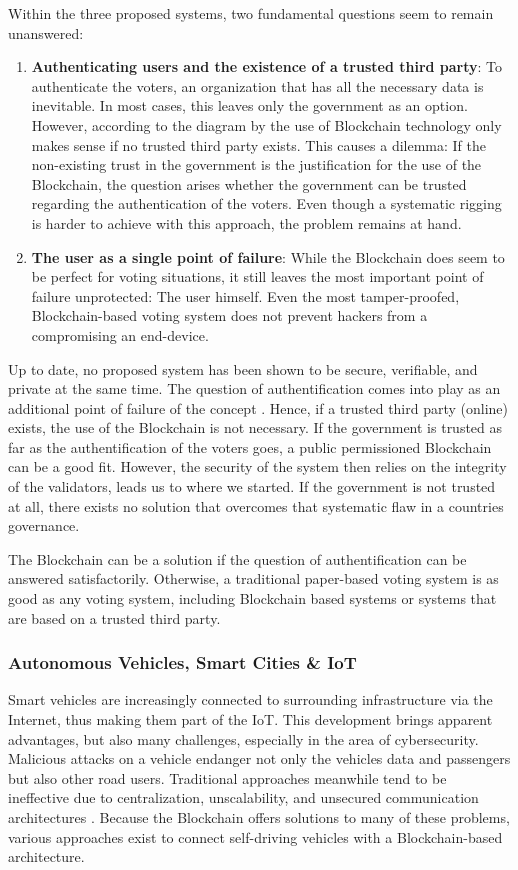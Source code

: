 Within the three proposed systems, two fundamental questions seem to remain unanswered:
\begin{enumerate}
    \item \textbf{Authenticating users and the existence of a trusted third party}: To authenticate the voters, an organization that has all the necessary data is inevitable. In most cases, this leaves only the government as an option. However, according to the diagram by \cite{Wust2017} the use of Blockchain technology only makes sense if no trusted third party exists. This causes a dilemma: If the non-existing trust in the government is the justification for the use of the Blockchain, the question arises whether the government can be trusted regarding the authentication of the voters. Even though a systematic rigging is harder to achieve with this approach, the problem remains at hand.
    \item \textbf{The user as a single point of failure}: While the Blockchain does seem to be perfect for voting situations, it still leaves the most important point of failure unprotected: The user himself. Even the most tamper-proofed, Blockchain-based voting system does not prevent hackers from a compromising an end-device.
\end{enumerate}

Up to date, no proposed system has been shown to be secure, verifiable, and private at the same time. The question of authentification comes into play as an additional point of failure of the concept \cite{Osgood2016}.
Hence, if a trusted third party (online) exists, the use of the Blockchain is not necessary. If the government is trusted as far as the authentification of the voters goes, a public permissioned Blockchain can be a good fit. However, the security of the system then relies on the integrity of the validators,  leads us to where we started. If the government is not trusted at all, there exists no solution that overcomes that systematic flaw in a countries governance.

The Blockchain can be a solution if the question of authentification can be answered satisfactorily. Otherwise, a traditional paper-based voting system is as good as any voting system, including Blockchain based systems or systems that are based on a trusted third party.

\subsubsection{Autonomous Vehicles, Smart Cities \& IoT}
Smart vehicles are increasingly connected to surrounding infrastructure via the Internet, thus making them part of the IoT. This development brings apparent advantages, but also many challenges, especially in the area of cybersecurity. Malicious attacks on a vehicle endanger not only the vehicles data and passengers but also other road users. Traditional approaches meanwhile tend to be ineffective due to centralization, unscalability, and unsecured communication architectures \cite{DorriSteger2017}. Because the Blockchain offers solutions to many of these problems, various approaches exist to connect self-driving vehicles with a Blockchain-based architecture.

